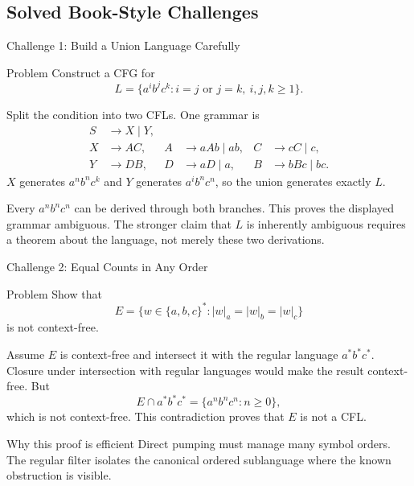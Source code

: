 \documentclass[10pt]{beamer}
\begin{document}
\subsection{Solved Book-Style Challenges}

\begin{frame}{Challenge 1: Build a Union Language Carefully}
  \footnotesize
  \begin{block}{Problem}
    Construct a CFG for
    \[
      L=\{a^i b^j c^k:i=j\text{ or }j=k,\ i,j,k\ge1\}.
    \]
  \end{block}
  Split the condition into two CFLs. One grammar is
  \[
    \begin{aligned}
      S&\to X\mid Y,\\
      X&\to AC, & A&\to aAb\mid ab, & C&\to cC\mid c,\\
      Y&\to DB, & D&\to aD\mid a,  & B&\to bBc\mid bc.
    \end{aligned}
  \]
  $X$ generates $a^n b^n c^k$ and $Y$ generates $a^i b^n c^n$, so the union
  generates exactly $L$.
  \pause

  Every $a^n b^n c^n$ can be derived through both branches. This proves the
  displayed grammar ambiguous. The stronger claim that $L$ is inherently
  ambiguous requires a theorem about the language, not merely these two
  derivations.
\end{frame}

\begin{frame}{Challenge 2: Equal Counts in Any Order}
  \small
  \begin{block}{Problem}
    Show that
    \[
      E=\{w\in\{a,b,c\}^*:|w|_a=|w|_b=|w|_c\}
    \]
    is not context-free.
  \end{block}
  Assume $E$ is context-free and intersect it with the regular language
  $a^*b^*c^*$. Closure under intersection with regular languages would make
  the result context-free. But
  \[
    E\cap a^*b^*c^*=\{a^n b^n c^n:n\ge0\},
  \]
  which is not context-free. This contradiction proves that $E$ is not a CFL.
  \pause
  \begin{exampleblock}{Why this proof is efficient}
    Direct pumping must manage many symbol orders. The regular filter isolates
    the canonical ordered sublanguage where the known obstruction is visible.
  \end{exampleblock}
\end{frame}
\end{document}
